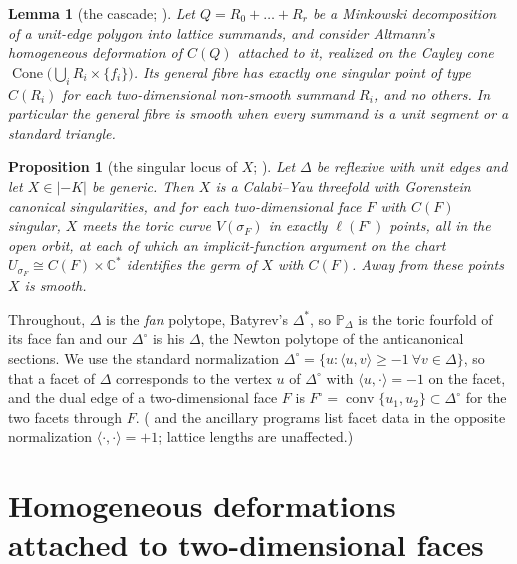\documentclass[11pt]{amsart}
\newtheorem{proposition}[theorem]{Proposition}
\newtheorem{lemma}[theorem]{Lemma}
\theoremstyle{definition}
\theoremstyle{remark}
\newcommand{\CC}{\mathbb{C}}
\newcommand{\PP}{\mathbb{P}}
\newcommand{\conv}{\operatorname{conv}}
\newcommand{\Cone}{\operatorname{Cone}}
\begin{document}
\begin{lemma}[the cascade; {\cite[Lemma~2.4]{paper1}}]\label{lem:cascade}
Let $Q = R_0 + \dots + R_r$ be a Minkowski decomposition of a unit-edge
polygon into lattice summands, and consider
Altmann's homogeneous deformation of $C(Q)$ attached to it, realized on
the Cayley cone $\Cone\bigl(\bigcup_i R_i\times\{f_i\}\bigr)$.  Its
general fibre has exactly one singular point of type $C(R_i)$ for each
two-dimensional non-smooth summand $R_i$, and no others.  In particular
the general fibre is \emph{smooth} when every summand is a unit segment
or a standard triangle.
\end{lemma}

\begin{proposition}[the singular locus of $X$;
{\cite[Prop.~3.1]{paper1}}]\label{prop:planting}
Let $\Delta$ be reflexive with unit edges and let $X \in |{-K}|$ be
generic.  Then $X$ is a Calabi--Yau threefold with Gorenstein canonical
singularities, and for each two-dimensional face $F$ with $C(F)$
\emph{singular}, $X$ meets the toric curve $V(\sigma_F)$ in exactly
$\ell(F^\circ)$ points, all in the open orbit, at each of which an
implicit-function argument on the chart
$U_{\sigma_F} \cong C(F)\times\CC^\ast$ identifies the germ of $X$ with
$C(F)$.  Away from these points $X$ is smooth.
\end{proposition}

Throughout, $\Delta$ is the \emph{fan} polytope, Batyrev's $\Delta^\ast$,
so $\PP_\Delta$ is the toric fourfold of its face fan and our
$\Delta^\circ$ is his $\Delta$, the Newton polytope of the anticanonical
sections.  We use the standard normalization
$\Delta^\circ = \{u : \langle u, v\rangle \ge -1 \ \forall v \in
\Delta\}$, so that a facet of $\Delta$ corresponds to the vertex $u$ of
$\Delta^\circ$ with $\langle u,\cdot\rangle = -1$ on the facet, and the
dual edge of a two-dimensional face $F$ is
$F^\circ = \conv\{u_1,u_2\} \subset \Delta^\circ$ for the two facets
through $F$.  (\cite{paper1} and the ancillary programs list facet data in
the opposite normalization $\langle \cdot,\cdot\rangle = +1$; lattice
lengths are unaffected.)

\section{Homogeneous deformations attached to two-dimensional faces}
\label{sec:datum}
\end{document}
